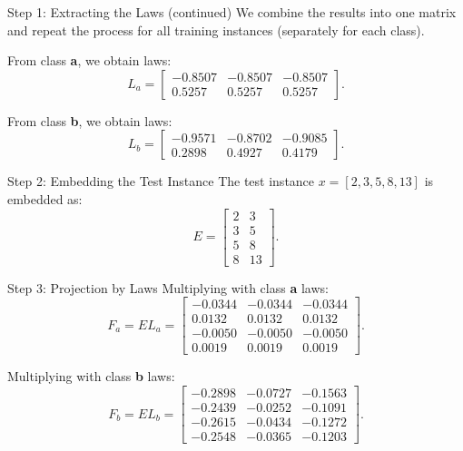\documentclass{beamer}
\begin{document}
\begin{frame}{Step 1: Extracting the Laws (continued)}
  We combine the results into one matrix and repeat the process for all training instances (separately for each class).

  From class \textbf{a}, we obtain laws:
  \begin{equation}
    L_a = \begin{bmatrix} -0.8507 & -0.8507 & -0.8507 \\ 0.5257 & 0.5257 & 0.5257 \end{bmatrix}.
  \end{equation}

  From class \textbf{b}, we obtain laws:
  \begin{equation}
    L_b = \begin{bmatrix} -0.9571 & -0.8702 & -0.9085 \\ 0.2898 & 0.4927 & 0.4179 \end{bmatrix}.
  \end{equation}
\end{frame}

\begin{frame}{Step 2: Embedding the Test Instance}
  The test instance \( x = [2, 3, 5, 8, 13] \) is embedded as:
  \begin{equation}
    E = \begin{bmatrix} 2 & 3 \\ 3 & 5 \\ 5 & 8 \\ 8 & 13 \end{bmatrix}.
  \end{equation}
\end{frame}

\begin{frame}{Step 3: Projection by Laws}
  Multiplying with class \textbf{a} laws:
  \begin{equation}
    F_a = E L_a = \begin{bmatrix} -0.0344 & -0.0344 & -0.0344 \\ 0.0132 & 0.0132 & 0.0132 \\ -0.0050 & -0.0050 & -0.0050 \\ 0.0019 & 0.0019 & 0.0019 \end{bmatrix}.
  \end{equation}

  Multiplying with class \textbf{b} laws:
  \begin{equation}
    F_b = E L_b = \begin{bmatrix} -0.2898 & -0.0727 & -0.1563 \\ -0.2439 & -0.0252 & -0.1091 \\ -0.2615 & -0.0434 & -0.1272 \\ -0.2548 & -0.0365 & -0.1203 \end{bmatrix}.
  \end{equation}
\end{frame}
\end{document}

